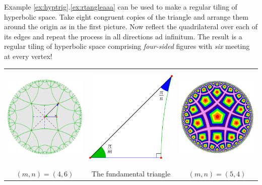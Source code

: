 Example \ref*{ex:hyptrig}.\ref{ex:rtangleaaa} can be used to make a regular tiling of hyperbolic space. Take eight congruent copies of the triangle and arrange them around the origin as in the first picture. Now reflect the quadrilateral over each of its edges and repeat the process in all directions ad infinitum. The result is a regular tiling of hyperbolic space comprising \emph{four-sided} figures with \emph{six} meeting at every vertex!

\begin{center}
	\begin{tabular}{@{}c@{\qquad}c@{\qquad}c@{}}
		\includegraphics[height=140pt]{isom-tiling}
		&\includegraphics[scale=0.95]{isom-right3}
		&\includegraphics[height=140pt]{tiling}\\[5pt]
		$(m,n)=(4,6)$
		&The fundamental triangle
		&$(m,n)=(5,4)$
	\end{tabular}
\end{center}


